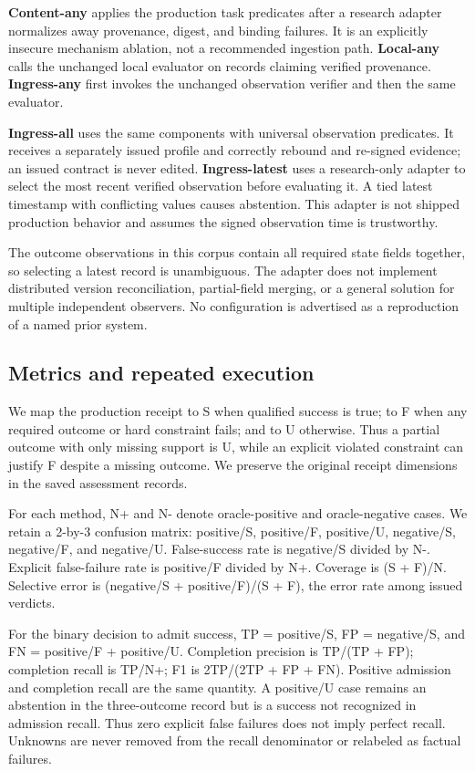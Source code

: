 \documentclass[11pt]{article}
\begin{document}
\textbf{Content-any} applies the production task predicates after a research adapter normalizes away provenance, digest, and binding failures. It is an explicitly insecure mechanism ablation, not a recommended ingestion path. \textbf{Local-any} calls the unchanged local evaluator on records claiming verified provenance. \textbf{Ingress-any} first invokes the unchanged observation verifier and then the same evaluator.

\textbf{Ingress-all} uses the same components with universal observation predicates. It receives a separately issued profile and correctly rebound and re-signed evidence; an issued contract is never edited. \textbf{Ingress-latest} uses a research-only adapter to select the most recent verified observation before evaluating it. A tied latest timestamp with conflicting values causes abstention. This adapter is not shipped production behavior and assumes the signed observation time is trustworthy.

The outcome observations in this corpus contain all required state fields together, so selecting a latest record is unambiguous. The adapter does not implement distributed version reconciliation, partial-field merging, or a general solution for multiple independent observers. No configuration is advertised as a reproduction of a named prior system.

\subsection{Metrics and repeated execution}
We map the production receipt to S when qualified success is true; to F when any required outcome or hard constraint fails; and to U otherwise. Thus a partial outcome with only missing support is U, while an explicit violated constraint can justify F despite a missing outcome. We preserve the original receipt dimensions in the saved assessment records.

For each method, N+ and N- denote oracle-positive and oracle-negative cases. We retain a 2-by-3 confusion matrix: positive/S, positive/F, positive/U, negative/S, negative/F, and negative/U. False-success rate is negative/S divided by N-. Explicit false-failure rate is positive/F divided by N+. Coverage is (S + F)/N. Selective error is (negative/S + positive/F)/(S + F), the error rate among issued verdicts.

For the binary decision to admit success, TP = positive/S, FP = negative/S, and FN = positive/F + positive/U. Completion precision is TP/(TP + FP); completion recall is TP/N+; F1 is 2TP/(2TP + FP + FN). Positive admission and completion recall are the same quantity. A positive/U case remains an abstention in the three-outcome record but is a success not recognized in admission recall. Thus zero explicit false failures does not imply perfect recall. Unknowns are never removed from the recall denominator or relabeled as factual failures.
\end{document}
